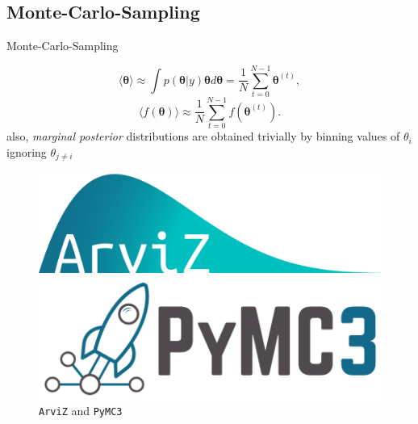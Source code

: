 \documentclass[11pt,aspectratio=1610,dvipsnames]{beamer}
\begin{document}
\subsection{Monte-Carlo-Sampling}
\begin{frame}{Monte-Carlo-Sampling}
	\begin{minipage}{\linewidth}
		\begin{minipage}{0.6\linewidth}
			\begin{tcolorbox}[colback=black!5,colframe=gray!15!black,title={Benefits of Monte-Carlo-Sampling}] 
				 \begin{equation}
					\langle \boldsymbol{\theta}\rangle\approx \int p(\boldsymbol{\theta} | y)\boldsymbol{\theta}d\boldsymbol{\theta}=\frac{1}{N}\sum_{t=0}^{N-1}\boldsymbol{\theta}^{(t)},
				\end{equation}
				 \begin{equation}
					\langle f(\boldsymbol{\theta})\rangle\approx\frac{1}{N}\sum_{t=0}^{N-1}f(\boldsymbol{\theta}^{(t)}).
				\end{equation}
				also, \emph{marginal posterior} distributions are obtained trivially by binning values of $\theta_i$ ignoring $\theta_{j\neq i}$
			\end{tcolorbox}
		\end{minipage}
		\hfill
		\begin{minipage}{0.3\linewidth}
			\begin{figure}
				\includegraphics[width=\linewidth]{arviz_logo}
				\vspace{0.1cm}
				
				\includegraphics[width=\linewidth]{PyMC3_banner}
				\caption{\texttt{ArviZ} \citet{ArviZ} and \texttt{PyMC3} \citet{PyMC3}}
			\end{figure}
			
		\end{minipage}
	\end{minipage}
	
	
\end{frame}
\end{document}
